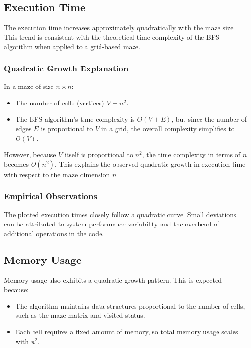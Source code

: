 \documentclass{article}
\begin{document}
\subsection*{Execution Time}

The execution time increases approximately quadratically with the maze size. This trend is consistent with the theoretical time complexity of the BFS algorithm when applied to a grid-based maze.

\subsubsection*{Quadratic Growth Explanation}

In a maze of size $n \times n$:

\begin{itemize}
    \item The number of cells (vertices) $V = n^2$.
    \item The BFS algorithm's time complexity is $O(V + E)$, but since the number of edges $E$ is proportional to $V$ in a grid, the overall complexity simplifies to $O(V)$.
\end{itemize}

However, because $V$ itself is proportional to $n^2$, the time complexity in terms of $n$ becomes $O(n^2)$. This explains the observed quadratic growth in execution time with respect to the maze dimension $n$.

\subsubsection*{Empirical Observations}

The plotted execution times closely follow a quadratic curve. Small deviations can be attributed to system performance variability and the overhead of additional operations in the code.

\subsection*{Memory Usage}

Memory usage also exhibits a quadratic growth pattern. This is expected because:

\begin{itemize}
    \item The algorithm maintains data structures proportional to the number of cells, such as the maze matrix and visited status.
    \item Each cell requires a fixed amount of memory, so total memory usage scales with $n^2$.
\end{itemize}
\end{document}
